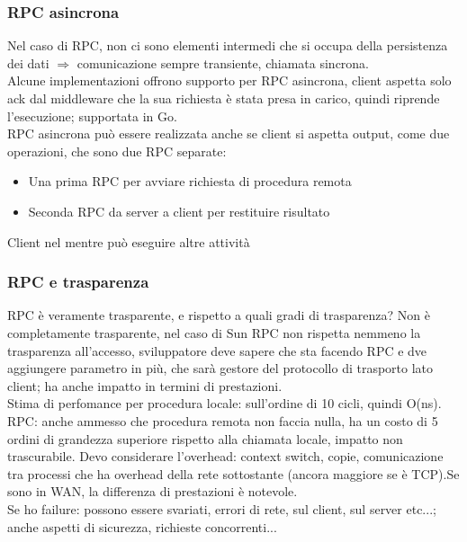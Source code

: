 \documentclass[16px]{article}
\begin{document}
\subsubsection{RPC asincrona}
Nel caso di RPC, non ci sono elementi intermedi che si occupa della persistenza dei dati $\Rightarrow$ comunicazione sempre transiente, chiamata sincrona.\\ Alcune implementazioni offrono supporto per RPC asincrona, client aspetta solo ack dal middleware che la sua richiesta è stata presa in carico, quindi riprende l'esecuzione; supportata in Go.\\ RPC asincrona può essere realizzata anche se client si aspetta output, come due operazioni, che sono due RPC separate:
\begin{itemize}
\item Una prima RPC per avviare richiesta di procedura remota
\item Seconda RPC da server a client per restituire risultato
\end{itemize}
Client nel mentre può eseguire altre attività
\subsubsection{RPC e trasparenza}
RPC è veramente trasparente, e rispetto a quali gradi di trasparenza? Non è completamente trasparente, nel caso di Sun RPC non rispetta nemmeno la trasparenza all'accesso, sviluppatore deve sapere che sta facendo RPC e dve aggiungere parametro in più, che sarà gestore del protocollo di trasporto lato client; ha anche impatto in termini di prestazioni.\\ Stima di perfomance per procedura locale: sull'ordine di 10 cicli, quindi O(ns).\\ RPC:
anche ammesso che procedura remota non faccia nulla, ha un costo di 5 ordini di grandezza superiore rispetto alla chiamata locale, impatto non trascurabile. Devo considerare l'overhead: context switch, copie, comunicazione tra processi che ha overhead della rete sottostante (ancora maggiore se è TCP).Se sono in WAN, la differenza di prestazioni è notevole.\\ Se ho failure: possono essere svariati, errori di rete, sul client, sul server etc...; anche aspetti di sicurezza, richieste concorrenti...
\end{document}
